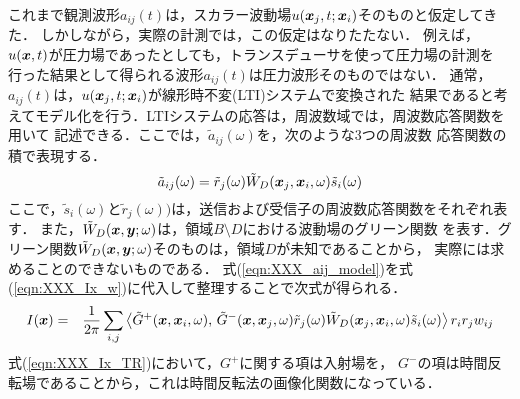 これまで観測波形$a_{ij}(t)$は，スカラー波動場$u(\mbox{\boldmath $x$}_j,t;\mbox{\boldmath $x$}_i)$そのものと仮定してきた．
しかしながら，実際の計測では，この仮定はなりたたない．
例えば，$u(\mbox{\boldmath $x$},t)$が圧力場であったとしても，トランスデューサを使って圧力場の計測を
行った結果として得られる波形$a_{ij}(t)$は圧力波形そのものではない．
通常，$a_{ij}(t)$は，$u(\mbox{\boldmath $x$}_j,t;\mbox{\boldmath $x$}_i)$が線形時不変(LTI)システムで変換された
結果であると考えてモデル化を行う．LTIシステムの応答は，周波数域では，周波数応答関数を用いて
記述できる．ここでは，$\tilde a_{ij}(\omega)$を，次のような3つの周波数
応答関数の積で表現する．
\begin{equation}
	\tilde a_{ij}(\omega) = \tilde r_j(\omega) \tilde W_D(\mbox{\boldmath $x$}_j,\mbox{\boldmath $x$}_i,\omega) \tilde s_i(\omega)
	\label{eqn:XXX_aij_model}
\end{equation}
ここで，$\tilde s_i(\omega)$と$\tilde r_j(\omega))$は，送信および受信子の周波数応答関数をそれぞれ表す．
また，$\tilde W_D(\mbox{\boldmath $x$},\mbox{\boldmath $y$};\omega)$は，領域$B\setminus D$における波動場のグリーン関数
を表す．グリーン関数$\tilde W_D(\mbox{\boldmath $x$},\mbox{\boldmath $y$};\omega)$そのものは，領域$D$が未知であることから，
実際には求めることのできないものである．
式(\ref{eqn:XXX_aij_model})を式(\ref{eqn:XXX_Ix_w})に代入して整理することで次式が得られる．
\begin{eqnarray}
	I(\mbox{\boldmath $x$}) 
	&=&
	\frac{1}{2\pi} \sum_{i,j} 
	\left< 
	\tilde{G}^+(\mbox{\boldmath $x$},\mbox{\boldmath $x$}_i,\omega)
	,\, 
	\tilde{G}^-(\mbox{\boldmath $x$},\mbox{\boldmath $x$}_j,\omega)\tilde r_j(\omega) \tilde W_D(\mbox{\boldmath $x$}_j,\mbox{\boldmath $x$}_i,\omega) \tilde{s}_i(\omega)
	\right> r_ir_jw_{ij}
	\label{eqn:XXX_Ix_TR}
\end{eqnarray}
式(\ref{eqn:XXX_Ix_TR})において，$G^+$に関する項は入射場を，
$G^-$の項は時間反転場であることから，これは時間反転法の画像化関数になっている．
%
%
%
%

